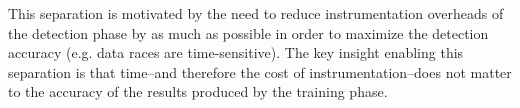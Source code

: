 \documentclass{sig-alternate}
\begin{document}
\begin{itemize}
This separation is motivated by the need to reduce instrumentation overheads of the detection phase by
as much as possible in order to maximize the detection accuracy (e.g. data races are time-sensitive). The key
insight enabling this separation is that time--and therefore the cost of instrumentation--does not matter to
the accuracy of the results produced by the training phase.



%
%
%
%


%
%
%



\end{itemize}
\end{document}
